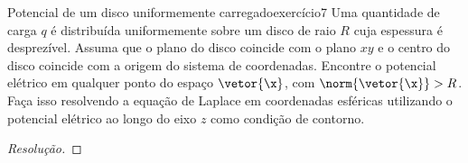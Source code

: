 \begin{exercício}{Potencial de um disco uniformemente carregado}{exercício7}
    Uma quantidade de carga \(q\) é distribuída uniformemente sobre um disco de raio \(R\) cuja espessura é desprezível. Assuma que o plano do disco coincide com o plano \(xy\) e o centro do disco coincide com a origem do sistema de coordenadas. Encontre o potencial elétrico em qualquer ponto do espaço \(\vetor{\x}\), com \(\norm{\vetor{\x}} > R\). Faça isso resolvendo a equação de Laplace em coordenadas esféricas utilizando o potencial elétrico ao longo do eixo \(z\) como condição de contorno.
\end{exercício}
\begin{proof}[Resolução]

\end{proof}
